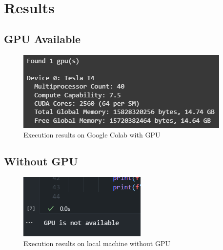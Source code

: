 \documentclass[12pt]{article}
\begin{document}
\section{Results}
\subsection{GPU Available}
\begin{figure}[H]
    \centering
    \includegraphics[width=0.75\linewidth]{images/output.png}
    \caption{Execution results on Google Colab with GPU}
    \label{fig:gpu}
\end{figure}

\subsection{Without GPU}
\begin{figure}[H]
    \centering
    \includegraphics[width=0.75\linewidth]{images/output2.png}
    \caption{Execution results on local machine without GPU}
    \label{fig:nogpu}
\end{figure}
\end{document}
